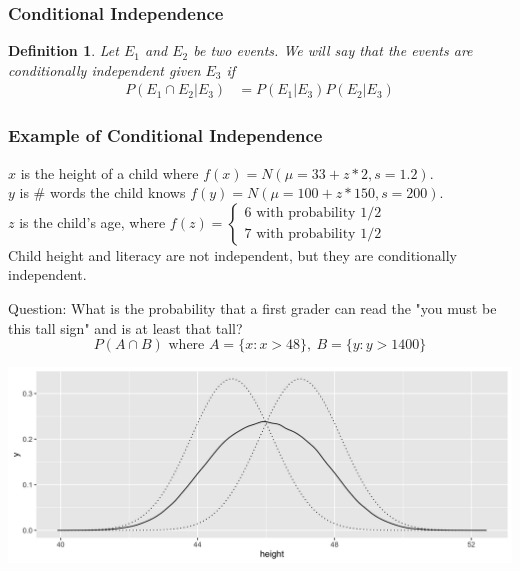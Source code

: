 \documentclass[aspectratio=169, handout]{beamer}
\newtheorem{defn}{Definition}
\numberwithin{equation}{section}
\begin{document}
\begin{frame}
\frametitle{Conditional Independence}

\begin{defn}
Let $E_{1}$ and $E_{2}$ be two events.  We will say that the events are conditionally independent given $E_{3}$ if 
\begin{align*}
P(E_{1} \cap E_{2} | E_{3}) &= P(E_{1} | E_{3} ) P(E_{2} | E_{3} ) 
\end{align*}
\end{defn}

\end{frame}

\begin{frame}
\frametitle{Example of Conditional Independence}

$x$ is the height of a child where $f(x)=N(\mu=33+z*2, s= 1.2)$.\\ 
$y$ is \# words the child knows $f(y)=N(\mu=100+z*150, s= 200)$.\\
$z$ is the child's age, where $f(z)=\begin{cases} 6\text{ with probability }1/2\\ 7\text{ with probability }1/2\end{cases}$\\

\vspace{1 cm}
Child height and literacy are not independent, but they are conditionally independent.
\vspace{1 cm}

Question:  What is the probability that a first grader can read the "you must be this tall sign" and is at least that tall?
$$P(A\cap B)\text{ where }A=\{x: x>48\}, \ B=\{y: y>1400\}$$
\end{frame}

\begin{frame}
\begin{center}
\includegraphics[width=5 in]{Heightdensity.png}
\end{center}
\end{frame}
\end{document}
